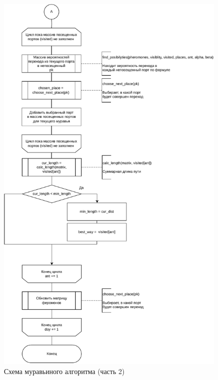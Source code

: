 \begin{figure}[h]
	\centering
	\includegraphics[height=0.9\textheight]{img/ants-2.pdf}
	\caption{Схема муравьиного алгоритма (часть 2)}
	\label{fig:ants-2}
\end{figure}

